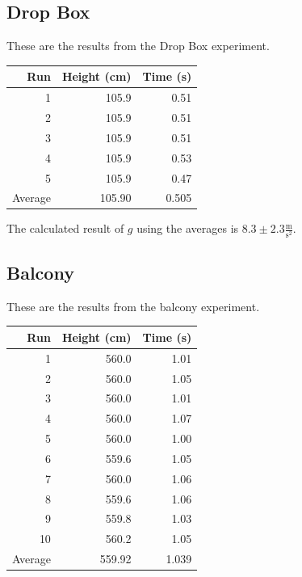 \documentclass[12pt]{article}
\begin{document}
\subsection{Drop Box}
\label{sec:org5d21adf}

These are the results from the Drop Box experiment.

\begin{center}
\begin{tabular}{r|r|r}
\hline
Run & Height (cm) & Time (s)\\
\hline
1 & 105.9 & 0.51\\
2 & 105.9 & 0.51\\
3 & 105.9 & 0.51\\
4 & 105.9 & 0.53\\
5 & 105.9 & 0.47\\
\hline
Average & 105.90 & 0.505\\
\end{tabular}
\end{center}

The calculated result of \(g\) using the averages is \(8.3\pm2.3 \frac{\text{m}}{\text{s}^{2}}\).
\subsection{Balcony}
\label{sec:orgbbf327e}

These are the results from the balcony experiment.

\begin{center}
\begin{tabular}{r|r|r}
\hline
Run & Height (cm) & Time (s)\\
\hline
1 & 560.0 & 1.01\\
2 & 560.0 & 1.05\\
3 & 560.0 & 1.01\\
4 & 560.0 & 1.07\\
5 & 560.0 & 1.00\\
6 & 559.6 & 1.05\\
7 & 560.0 & 1.06\\
8 & 559.6 & 1.06\\
9 & 559.8 & 1.03\\
10 & 560.2 & 1.05\\
\hline
Average & 559.92 & 1.039\\
\end{tabular}
\end{center}
\end{document}
